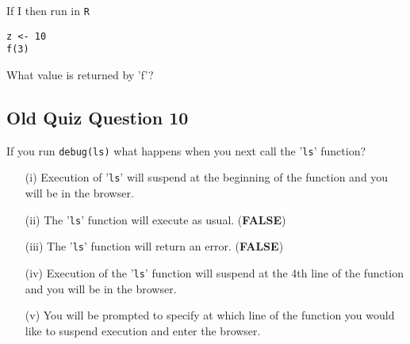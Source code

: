 \documentclass[]{article}
\begin{document}
If I then run in \texttt{R}
\begin{verbatim}
z <- 10
f(3)
\end{verbatim}
What value is returned by 'f'?

\newpage
\subsection*{Old Quiz Question 10}
If you run
\texttt{debug(ls)}
what happens when you next call the '\texttt{ls}' function?
\begin{enumerate}
\item[(i)] Execution of '\texttt{ls}' will suspend at the beginning of the function and you will be in the browser.
\item[(ii)] The '\texttt{ls}' function will execute as usual. (\textbf{FALSE})
\item[(iii)] The '\texttt{ls}' function will return an error. (\textbf{FALSE})
\item[(iv)] Execution of the '\texttt{ls}' function will suspend at the 4th line of the function and you will be in the browser.
\item[(v)] You will be prompted to specify at which line of the function you would like to suspend execution and enter the browser.
\end{enumerate}
\end{document}

